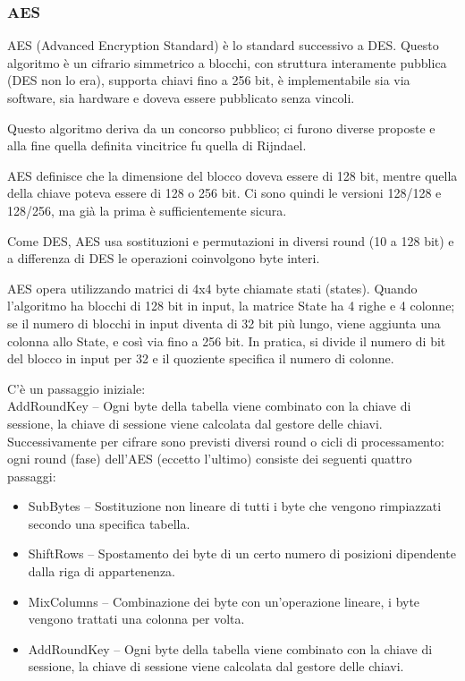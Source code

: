 \subsubsection{AES}
AES (Advanced Encryption Standard) è lo standard successivo a DES.
Questo algoritmo è un cifrario simmetrico a blocchi, con struttura interamente pubblica (DES non lo era), supporta chiavi fino a 256 bit, è implementabile sia via software, sia hardware e doveva essere pubblicato senza vincoli.

Questo algoritmo deriva da un concorso pubblico;
ci furono diverse proposte e alla fine quella definita vincitrice fu quella di Rijndael.

AES definisce che la dimensione del blocco doveva essere di 128 bit, mentre quella della chiave poteva essere di 128 o 256 bit.
Ci sono quindi le versioni 128/128 e 128/256, ma già la prima è sufficientemente sicura.

Come DES, AES usa sostituzioni e permutazioni in diversi round (10 a 128 bit) e a differenza di DES le operazioni coinvolgono byte interi.

AES opera utilizzando matrici di 4x4 byte chiamate stati (states).
Quando l'algoritmo ha blocchi di 128 bit in input, la matrice State ha 4 righe e 4 colonne;
se il numero di blocchi in input diventa di 32 bit più lungo, viene aggiunta una colonna allo State, e così via fino a 256 bit.
In pratica, si divide il numero di bit del blocco in input per 32 e il quoziente specifica il numero di colonne.

C'è un passaggio iniziale:\\
AddRoundKey – Ogni byte della tabella viene combinato con la chiave di sessione, la chiave di sessione viene calcolata dal gestore delle chiavi.
Successivamente per cifrare sono previsti diversi round o cicli di processamento: ogni round (fase) dell'AES (eccetto l'ultimo) consiste dei seguenti quattro passaggi:
\begin{itemize}
\item SubBytes – Sostituzione non lineare di tutti i byte che vengono rimpiazzati secondo una specifica tabella.
\item ShiftRows – Spostamento dei byte di un certo numero di posizioni dipendente dalla riga di appartenenza.
\item MixColumns – Combinazione dei byte con un'operazione lineare, i byte vengono trattati una colonna per volta.
\item AddRoundKey – Ogni byte della tabella viene combinato con la chiave di sessione, la chiave di sessione viene calcolata dal gestore delle chiavi.
\end{itemize}

